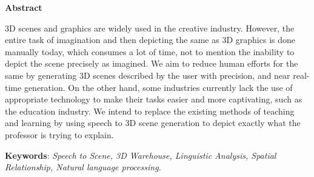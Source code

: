 \newpage
\thispagestyle{empty}
\begin{center}
\textbf{Abstract}\\
\end{center}
3D scenes and graphics are widely used in the creative industry. However, the entire task of imagination and then depicting the same as 3D graphics is done manually today, which consumes a lot of time, not to mention the inability to depict the scene precisely as imagined. We aim to reduce human efforts for the same by generating 3D scenes described by the user with precision, and near real-time generation. 
On the other hand, some industries currently lack the use of appropriate technology to make their tasks easier and more captivating, such as the education industry. We intend to replace the existing methods of teaching and learning by using speech to 3D scene generation to depict exactly what the professor is trying to explain.

{\bf Keywords}: {\it Speech to Scene, 3D Warehouse, Linguistic Analysis, Spatial Relationship, Natural language processing. }